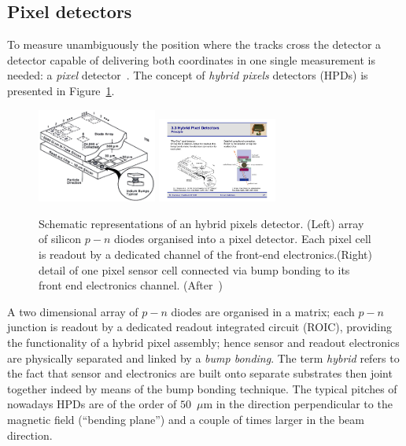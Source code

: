 \subsection{Pixel detectors}
\label{sec:pixels}
To measure unambiguously the position where the tracks cross the detector a detector capable 
of delivering both coordinates in one single measurement is needed: a {\it pixel} detector~\cite{Pixels}.
The concept of {\it hybrid pixels} detectors (HPDs) is presented in Figure~\ref{fig:pixels}. 
 \begin{figure}[htbp]
   \centering
  \includegraphics[width=0.35\textwidth]{HPD.pdf} 
    \includegraphics[width=0.35\textwidth]{pixel_bb_roc.pdf} 
      \caption{\label{fig:pixels} Schematic representations of an hybrid pixels detector. (Left) array 
      of silicon $p-n$ diodes organised into a pixel detector. Each pixel cell is readout by a dedicated 
      channel of the front-end electronics.(Right) detail of one pixel sensor cell connected via bump 
      bonding to its front end electronics channel. (After~\cite{Pixels,Pixels2003})}
\end{figure}
A two dimensional array of $p-n$ diodes are organised in a matrix; each $p-n$ junction is readout 
by a dedicated  readout integrated circuit (ROIC), providing the functionality of a hybrid pixel assembly; 
hence sensor and readout electronics are physically separated 
and linked by a {\it bump bonding}. The term {\it hybrid} refers to the fact that sensor and electronics 
are built onto separate substrates then joint together indeed by means of the bump bonding technique.
The typical pitches of nowadays HPDs are of the order of 
 $50$~$\mu$m in the direction perpendicular to the magnetic field (``bending plane'') and 
 a couple of times larger in the beam direction.
 


